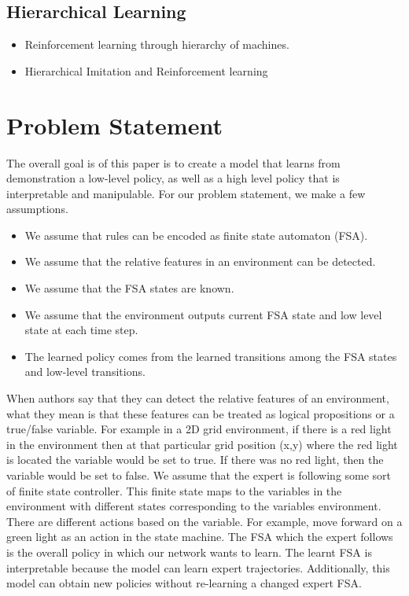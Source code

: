 \documentclass[letterpaper, 10 pt, conference]{ieeeconf}  %
\begin{document}
\subsection{Hierarchical Learning}

\begin{itemize}
  \item Reinforcement learning through hierarchy of machines.
  \item Hierarchical Imitation and Reinforcement learning
\end{itemize}

\section{Problem Statement}
The overall goal is of this paper is to create a model that learns from demonstration a low-level policy, as well as a high level policy that is interpretable and manipulable. For our problem statement, we make a few assumptions. 
\begin{itemize}
  \item We assume that rules can be encoded as finite state automaton (FSA). 
  \item We assume that the relative features in an environment can be detected.
  \item We assume that the FSA states are known.
  \item We assume that the environment outputs current FSA state and low level state at each time step.
  \item The learned policy comes from the learned transitions among the FSA states and low-level transitions.
\end{itemize}

When authors say that they can detect the relative features of an environment, what they mean is that these features can be treated as logical propositions or a true/false variable. For example in a 2D grid environment, if there is a red light in the environment then at that particular grid position (x,y) where the red light is located the variable would be set to true. If there was no red light, then the variable would be set to false.
\newline
\indent We assume that the expert is following some sort of finite state controller. This finite state maps to the variables in the environment with different states corresponding to the variables environment. There are different actions based on the variable. For example, move forward on a green light as an action in the state machine. The FSA which the expert follows is the overall policy in which our network wants to learn. The learnt FSA is interpretable because the model can learn expert trajectories. Additionally, this model can obtain new policies without re-learning a changed expert FSA.
\end{document}

